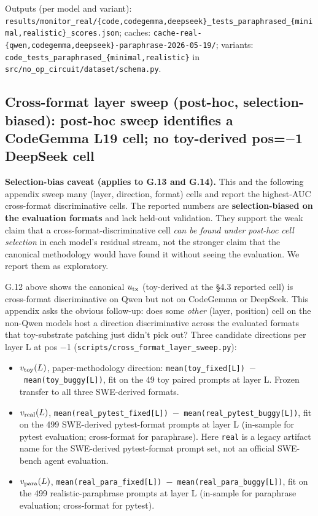 \documentclass[
  11pt,
  a4paper]{article}
\providecommand{\tightlist}{%
  \setlength{\itemsep}{0pt}\setlength{\parskip}{0pt}}
\begin{document}
Outputs (per model and variant):
\texttt{results/}\allowbreak\texttt{monitor\_real/}\allowbreak\texttt{\{code,codegemma,deepseek\}\_tests\_paraphrased\_\{minimal,realistic\}\_scores.json};
caches:
\texttt{cache-real-}\allowbreak\texttt{\{qwen,}\allowbreak\texttt{codegemma,}\allowbreak\texttt{deepseek\}-}\allowbreak\texttt{paraphrase-2026-05-19/};
variants: \texttt{code\_tests\_paraphrased\_\{minimal,realistic\}} in
\texttt{src/no\_op\_circuit/dataset/schema.py}.

\subsection{Cross-format layer sweep (post-hoc, selection-biased):
post-hoc sweep identifies a CodeGemma L19 cell; no toy-derived pos=\ensuremath{-}1
DeepSeek
cell}\label{cross-format-layer-sweep-post-hoc-selection-biased-post-hoc-sweep-identifies-a-codegemma-l19-cell-no-toy-derived-pos1-deepseek-cell}

\textbf{Selection-bias caveat (applies to G.13 and G.14).} This and the
following appendix sweep many (layer, direction, format) cells and
report the highest-AUC cross-format discriminative cells. The reported
numbers are \textbf{selection-biased on the evaluation formats} and lack
held-out validation. They support the weak claim that a
cross-format-discriminative cell \emph{can be found under post-hoc cell
selection} in each model's residual stream, not the stronger claim that
the canonical methodology would have found it without seeing the
evaluation. We report them as exploratory.

G.12 above shows the canonical \(u_{\rm tx}\) (toy-derived at the \S{}4.3
reported cell) is cross-format discriminative on Qwen but not on
CodeGemma or DeepSeek. This appendix asks the obvious follow-up: does
some \emph{other} (layer, position) cell on the non-Qwen models host a
direction discriminative across the evaluated formats that toy-substrate
patching just didn't pick out? Three candidate directions per layer L at
pos \ensuremath{-}1 (\texttt{scripts/cross\_format\_layer\_sweep.py}):

\begin{itemize}
\tightlist
\item
  \(v_{\rm toy}(L)\), paper-methodology direction:
  \texttt{mean(toy\_fixed{[}L{]})\ \ensuremath{-}\ mean(toy\_buggy{[}L{]})}, fit on
  the 49 toy paired prompts at layer L. Frozen transfer to all three
  SWE-derived formats.
\item
  \(v_{\rm real}(L)\),
  \texttt{mean(real\_pytest\_fixed{[}L{]})\ \ensuremath{-}\ mean(real\_pytest\_buggy{[}L{]})},
  fit on the 499 SWE-derived pytest-format prompts at layer L (in-sample
  for pytest evaluation; cross-format for paraphrase). Here
  \texttt{real} is a legacy artifact name for the SWE-derived
  pytest-format prompt set, not an official SWE-bench agent evaluation.
\item
  \(v_{\rm para}(L)\),
  \texttt{mean(real\_para\_fixed{[}L{]})\ \ensuremath{-}\ mean(real\_para\_buggy{[}L{]})},
  fit on the 499 realistic-paraphrase prompts at layer L (in-sample for
  paraphrase evaluation; cross-format for pytest).
\end{itemize}
\end{document}
